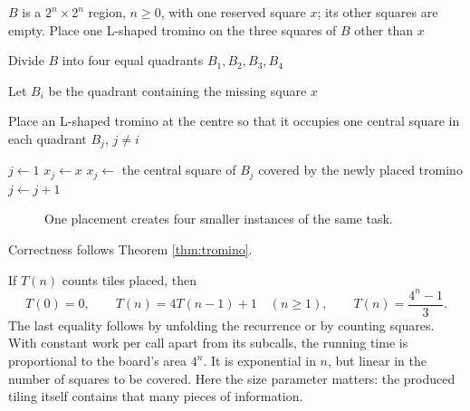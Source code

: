 \begin{algorithm}[ht]
\caption{Recursive algorithm for tiling a deficient $2^n\times2^n$ board. \href{https://subhashis-banerjee.in/Courses/QRMT_Monsoon2026/programs/trominoes.py}{Click here to download a Python code that illustrates the solution,}}
\label{algo:tromino}
\begin{algorithmic}[1]
\Require $B$ is a $2^n\times2^n$ region, $n\geq0$, with one reserved square
$x$; its other squares are empty.
    \State Place one L-shaped tromino on the three squares of $B$
           other than $x$
    \State \Return
\EndIf

\State Divide $B$ into four equal quadrants
       $B_1,B_2,B_3,B_4$

\State Let $B_i$ be the quadrant containing the missing square $x$

\State Place an L-shaped tromino at the centre so that it occupies
       one central square in each quadrant $B_j$, $j\neq i$

$j \leftarrow 1$
        \State $x_j \gets x$
    \Else
        \State $x_j \gets$ the central square of $B_j$
               covered by the newly placed tromino
    \EndIf
    \State {}
    \State $j \leftarrow j+1$
\EndWhile

\EndProcedure

\end{algorithmic}
\end{algorithm}


\begin{figure}[ht]
\centering
{}
\caption{One placement creates four smaller instances of the same task.}
\end{figure}

Correctness follows Theorem \ref{thm:tromino}.

If $T(n)$ counts tiles placed, then
\[
T(0)=0,\qquad T(n)=4T(n-1)+1\quad(n\geq1),
\qquad T(n)=\frac{4^n-1}{3}.
\]
The last equality follows by unfolding the recurrence or by counting squares.
With constant work per call apart from its subcalls, the running time is
proportional to the board's area $4^n$. It is exponential in $n$, but linear
in the number of squares to be covered. Here the size parameter matters:
the produced tiling itself contains that many pieces of information.

